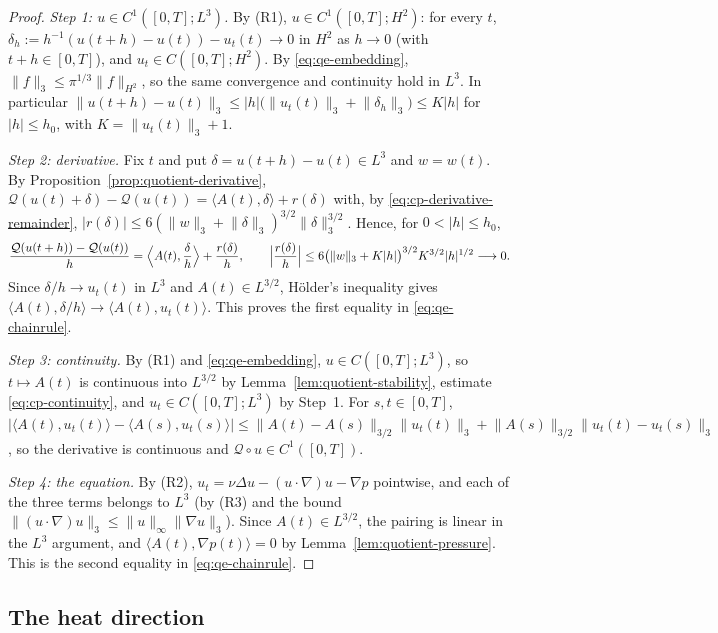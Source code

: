 \documentclass[11pt]{article}
\theoremstyle{definition}
\theoremstyle{plain}
\newcommand{\norm}[1]{\lVert #1\rVert}
\begin{document}
\begin{proof}
\emph{Step 1: $u\in C^1([0,T];L^3)$.}  By (R1), $u\in C^1([0,T];H^2)$:
for every $t$, $\delta_h:=h^{-1}(u(t+h)-u(t))-u_t(t)\to0$ in $H^2$ as
$h\to0$ (with $t+h\in[0,T]$), and $u_t\in C([0,T];H^2)$.  By
\eqref{eq:qe-embedding}, $\norm f_3\le\pi^{1/3}\norm f_{H^2}$, so the same
convergence and continuity hold in $L^3$.  In particular
$\norm{u(t+h)-u(t)}_3\le|h|\bigl(\norm{u_t(t)}_3+\norm{\delta_h}_3\bigr)\le K|h|$
for $|h|\le h_0$, with $K=\norm{u_t(t)}_3+1$.

\emph{Step 2: derivative.}  Fix $t$ and put $\delta=u(t+h)-u(t)\in L^3$
and $w=w(t)$.  By Proposition~\ref{prop:quotient-derivative},
$\mathcal Q(u(t)+\delta)-\mathcal Q(u(t))=\langle A(t),\delta\rangle+r(\delta)$
with, by \eqref{eq:cp-derivative-remainder},
$|r(\delta)|\le6(\norm w_3+\norm\delta_3)^{3/2}\norm\delta_3^{3/2}$.  Hence,
for $0<|h|\le h_0$,
\[
 \frac{\mathcal Q(u(t+h))-\mathcal Q(u(t))}h
 =\Bigl\langle A(t),\frac{\delta}h\Bigr\rangle+\frac{r(\delta)}h,
 \qquad
 \Bigl|\frac{r(\delta)}h\Bigr|
 \le6\bigl(\norm w_3+K|h|\bigr)^{3/2}K^{3/2}|h|^{1/2}\longrightarrow0 .
\]
Since $\delta/h\to u_t(t)$ in $L^3$ and $A(t)\in L^{3/2}$, H\"older's
inequality gives $\langle A(t),\delta/h\rangle\to\langle A(t),u_t(t)\rangle$.
This proves the first equality in \eqref{eq:qe-chainrule}.

\emph{Step 3: continuity.}  By (R1) and \eqref{eq:qe-embedding},
$u\in C([0,T];L^3)$, so $t\mapsto A(t)$ is continuous into $L^{3/2}$ by
Lemma~\ref{lem:quotient-stability}, estimate \eqref{eq:cp-continuity}, and
$u_t\in C([0,T];L^3)$ by Step~1.  For $s,t\in[0,T]$,
$|\langle A(t),u_t(t)\rangle-\langle A(s),u_t(s)\rangle|
\le\norm{A(t)-A(s)}_{3/2}\norm{u_t(t)}_3+\norm{A(s)}_{3/2}\norm{u_t(t)-u_t(s)}_3$,
so the derivative is continuous and $\mathcal Q\circ u\in C^1([0,T])$.

\emph{Step 4: the equation.}  By (R2), $u_t=\nu\Delta u-(u\cdot\nabla)u-\nabla p$
pointwise, and each of the three terms belongs to $L^3$ (by (R3) and the
bound $\norm{(u\cdot\nabla)u}_3\le\norm u_\infty\norm{\nabla u}_3$).
Since $A(t)\in L^{3/2}$, the pairing is linear in the $L^3$ argument, and
$\langle A(t),\nabla p(t)\rangle=0$ by Lemma~\ref{lem:quotient-pressure}.
This is the second equality in \eqref{eq:qe-chainrule}.
\end{proof}

\subsection{The heat direction}
\label{subsec:qe-heat}
\end{document}
